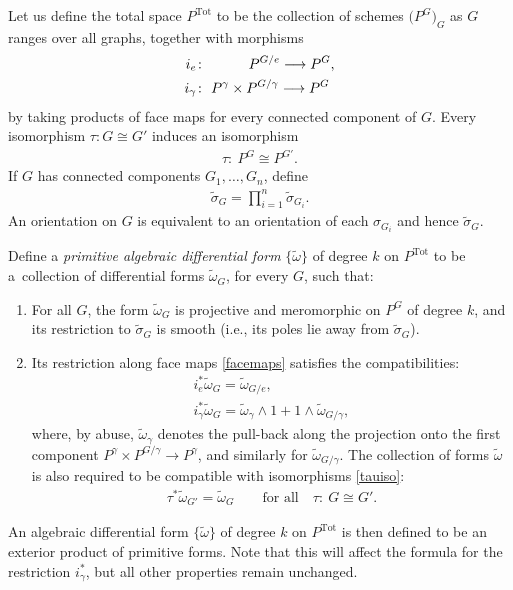 \documentclass[pdftex]{sigma}%
\numberwithin{equation}{section}
\newcommand{\To}{\longrightarrow}
\newcommand{\0}{\color{blue}{\mathsf{0}}}
\begin{document}
Let us define the total space $P^{\mathrm{Tot}}$ to be the collection of schemes $\big(P^G\big)_G$ as $G$ ranges over all graphs, together with morphisms
\begin{align}
i_{e}\colon \ &\hphantom{P^{\gamma} \times{}\, }P^{G/e}\To P^G,\nonumber
\\
i_{\gamma}\colon \ &P^{\gamma} \times P^{G/\gamma} \To P^G\label{facemaps}
\end{align}
by taking products of face maps for every connected component of $G$. Every isomorphism $\tau\colon G\cong G'$ induces an isomorphism
\begin{gather}
\tau\colon\ P^{G} \cong P^{G'} . \label{tauiso}
\end{gather}
If $G$ has connected components $G_1,\dots, G_n$, define
\begin{gather*}
\widetilde{\sigma}_G = \prod_{i=1}^n \widetilde{\sigma}_{G_i}.
\end{gather*}
 An orientation on $G$ is equivalent to an orientation of each $\sigma_{G_i}$ and hence $\widetilde{\sigma}_G$.

\begin{defn} \label{defn: formsonPtot} Define a \emph{primitive algebraic differential form} $\{\widetilde{\omega}\}$ of degree $k$ on $P^{\mathrm{Tot}}$ to be a~collection of differential forms $\widetilde{\omega}_G$, for every $G$, such that:
\begin{enumerate}\itemsep=0pt

\item For all $G$, the form $\widetilde{\omega}_G$ is projective and meromorphic on $P^G$ of degree $k$, and its restriction to $\widetilde{\sigma}_G$ is smooth (i.e., its poles lie away from $\widetilde{\sigma}_G$).

\item Its restriction along face maps \eqref{facemaps} satisfies the compatibilities:
\begin{gather*}
i_e^* \widetilde{\omega}_G = \widetilde{\omega}_{G/e},
\\
i_{\gamma}^* \widetilde{\omega}_{G} = \widetilde{\omega}_{\gamma} \wedge 1 + 1\wedge \widetilde{\omega}_{G/\gamma},
\end{gather*}
where, by abuse, $\widetilde{\omega}_{\gamma} $ denotes the pull-back along the projection onto the first component $P^{\gamma} \times P^{G/\gamma} \rightarrow P^{\gamma}$, and similarly for $\widetilde{\omega}_{G/\gamma}$. The collection of forms $\widetilde{\omega}$ is
 also required to be compatible with isomorphisms \eqref{tauiso}:
\begin{gather*}
\tau^* \widetilde{\omega}_{G'} = \widetilde{\omega}_{G} \qquad \text{for all}\quad \tau\colon\ G \cong G'.
\end{gather*}
\end{enumerate}
An algebraic differential form $\{\widetilde{\omega}\}$ of degree $k$ on $P^{\mathrm{Tot}}$ is then defined to be an exterior product of primitive forms. Note that this will affect the formula for the restriction $i_{\gamma}^*$, but all other properties remain unchanged.
\end{defn}
\end{document}
